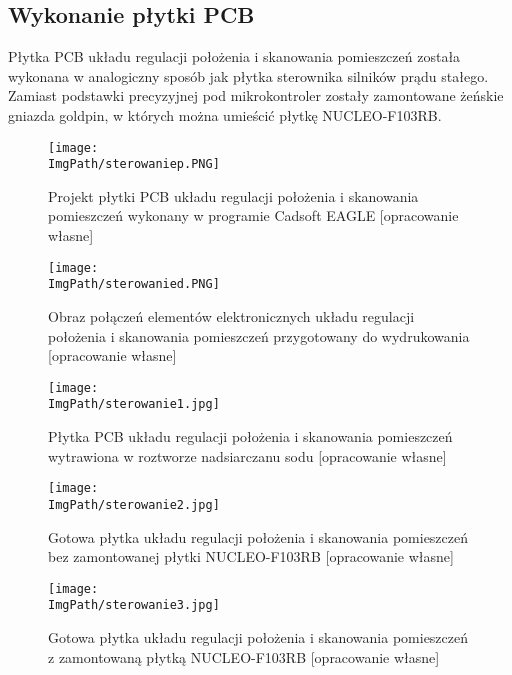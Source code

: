 \documentclass[a4paper,12pt,twoside,openany]{report}
\newcommand{\ImgPath}{.}
\begin{document}
\subsection{Wykonanie płytki PCB}

Płytka PCB układu regulacji położenia i skanowania pomieszczeń została wykonana w analogiczny sposób jak płytka sterownika silników prądu stałego. Zamiast podstawki precyzyjnej pod mikrokontroler zostały zamontowane żeńskie gniazda goldpin, w których można umieścić płytkę NUCLEO-F103RB.

\begin{figure}[!htbp]
	\begin{center}
\centering
\texttt{[image: \\ImgPath/sterowaniep.PNG]}
\end{center}
	\caption{Projekt płytki PCB układu regulacji położenia i skanowania pomieszczeń wykonany w programie Cadsoft EAGLE [opracowanie własne]}
	\label{schematKomunikacji}
\end{figure}

\begin{figure}[!htbp]
	\begin{center}
\centering
\texttt{[image: \\ImgPath/sterowanied.PNG]}
\end{center}
	\caption{Obraz połączeń elementów elektronicznych układu regulacji położenia i skanowania pomieszczeń przygotowany do wydrukowania [opracowanie własne]}
	\label{schematKomunikacji}
\end{figure}

\begin{figure}[!htbp]
	\begin{center}
\centering
\texttt{[image: \\ImgPath/sterowanie1.jpg]}
\end{center}
	\caption{Płytka PCB układu regulacji położenia i skanowania pomieszczeń wytrawiona w roztworze nadsiarczanu sodu [opracowanie własne]}
	\label{schematKomunikacji}
\end{figure}

\begin{figure}[!htbp]
	\begin{center}
\centering
\texttt{[image: \\ImgPath/sterowanie2.jpg]}
\end{center}
	\caption{Gotowa płytka układu regulacji położenia i skanowania pomieszczeń bez zamontowanej płytki NUCLEO-F103RB [opracowanie własne]}
	\label{schematKomunikacji}
\end{figure}

\begin{figure}[!htbp]
	\begin{center}
\centering
\texttt{[image: \\ImgPath/sterowanie3.jpg]}
\end{center}
	\caption{Gotowa płytka układu regulacji położenia i skanowania pomieszczeń z zamontowaną płytką NUCLEO-F103RB [opracowanie własne]}
	\label{schematKomunikacji}
\end{figure}
\end{document}
